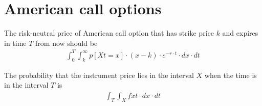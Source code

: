 \section{American call options}

The risk-neutral price of American call option
that has strike price $k$ and expires in time $T$ from now
should be
\begin{align}
    \int_0^T \int_k^\infty p [X t = x] \cdot (x - k) \cdot e^{-r \cdot t} \cdot dx \cdot dt
\end{align}

The probability that the instrument price lies in the interval $X$
when the time is in the interval $T$ is
\begin{align}
    \int_T \int_X f x t \cdot dx \cdot dt
\end{align}
